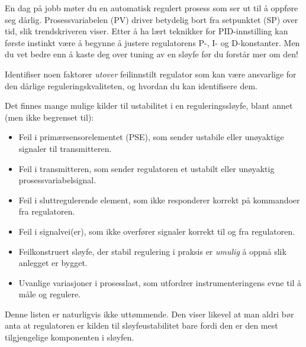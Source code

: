 En dag på jobb møter du en automatisk regulert prosess som ser ut til å oppføre seg dårlig. Prosessvariabelen (PV) driver betydelig bort fra setpunktet (SP) over tid, slik trendskriveren viser. Etter å ha lært teknikker for PID-innstilling kan første instinkt være å begynne å justere regulatorens P-, I- og D-konstanter. Men du vet bedre enn å kaste deg over tuning av en sløyfe før du forstår mer om den!

\vskip 10pt

Identifiser noen faktorer {\it utover} feilinnstilt regulator som kan være ansvarlige for den dårlige reguleringskvaliteten, og hvordan du kan identifisere dem.







Det finnes mange mulige kilder til ustabilitet i en reguleringssløyfe, blant annet (men ikke begrenset til):

\begin{itemize}
\item{}Feil i primærsensorelementet (PSE), som sender ustabile eller unøyaktige signaler til transmitteren.
\item{}Feil i transmitteren, som sender regulatoren et ustabilt eller unøyaktig prosessvariabelsignal.
\item{}Feil i sluttregulerende element, som ikke responderer korrekt på kommandoer fra regulatoren.
\item{}Feil i signalvei(er), som ikke overfører signaler korrekt til og fra regulatoren.
\item{}Feilkonstruert sløyfe, der stabil regulering i praksis er {\it umulig} å oppnå slik anlegget er bygget.
\item{}Uvanlige variasjoner i prosesslast, som utfordrer instrumenteringens evne til å måle og regulere.
\end{itemize}







Denne listen er naturligvis ikke uttømmende. Den viser likevel at man aldri bør anta at regulatoren er kilden til sløyfeustabilitet bare fordi den er den mest tilgjengelige komponenten i sløyfen.


